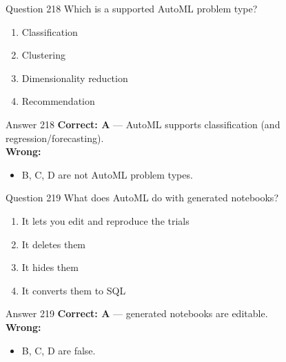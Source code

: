 \documentclass[aspectratio=169,11pt]{beamer}
\begin{document}
	\begin{frame}{Question 218}
		Which is a supported AutoML problem type?
		\begin{enumerate}[label=\Alph*.]
			\item Classification
			\item Clustering
			\item Dimensionality reduction
			\item Recommendation
		\end{enumerate}
	\end{frame}
	\begin{frame}{Answer 218}
		\textbf{Correct: A} --- AutoML supports classification (and regression/forecasting).\\
		\vspace{0.5em}
		\textbf{Wrong:}
		\begin{itemize}
			\item B, C, D are not AutoML problem types.
		\end{itemize}
	\end{frame}
	
	\begin{frame}{Question 219}
		What does AutoML do with generated notebooks?
		\begin{enumerate}[label=\Alph*.]
			\item It lets you edit and reproduce the trials
			\item It deletes them
			\item It hides them
			\item It converts them to SQL
		\end{enumerate}
	\end{frame}
	\begin{frame}{Answer 219}
		\textbf{Correct: A} --- generated notebooks are editable.\\
		\vspace{0.5em}
		\textbf{Wrong:}
		\begin{itemize}
			\item B, C, D are false.
		\end{itemize}
	\end{frame}
	
\end{document}
